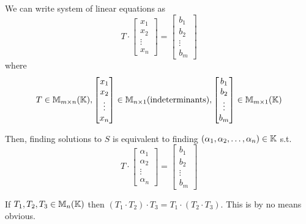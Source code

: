 \begin{observe}
    We can write system of linear equations as \[
        T \cdot 
                \begin{bmatrix}
                    x_1 \\ x_2 \\ \vdots \\ x_n
                \end{bmatrix} = \begin{bmatrix}
                    
                    b_1 \\ b_2 \\ \vdots \\ b_m
                \end{bmatrix}
    \] where \[
        T \in \mathbb{M}_{m\times n}(\mathbb{K}), \begin{bmatrix}
            x_1 \\ x_2 \\ \vdots \\ x_n
        \end{bmatrix} \in \mathbb{M}_{n \times 1}(\text{indeterminants}), 
        \begin{bmatrix}
            b_1 \\ b_2 \\ \vdots \\ b_m
        \end{bmatrix} \in \mathbb{M}_{m \times 1}(\mathbb{K})
    \]

    Then, finding solutions to \(S\) is equivalent to finding \((\alpha_1, \alpha_2, \dots, \alpha_n) \in \mathbb{K}\) s.t.
    \[
        T \cdot
            \begin{bmatrix}
                \alpha_1 \\ \alpha_2 \\ \vdots \\ \alpha_n
            \end{bmatrix} =
            \begin{bmatrix}
                b_1 \\ b_2 \\ \vdots \\ b_m
            \end{bmatrix}
    \]
\end{observe}

\begin{exercise}
    If \(T_1, T_2, T_3 \in \mathbb{M}_n(\mathbb{K})\) then \((T_1 \cdot T_2) \cdot T_3 = T_1 \cdot (T_2 \cdot T_3)\). This is by no means obvious.
\end{exercise}

